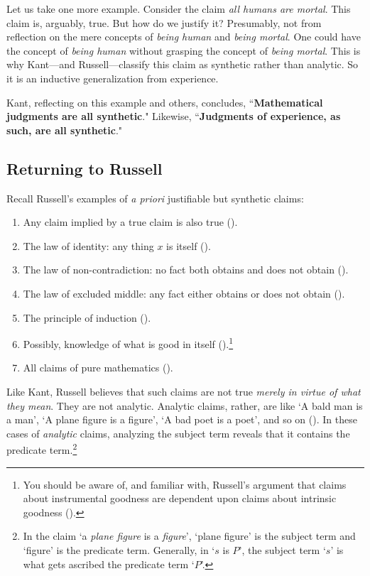 \documentclass[oneside,letterpaper,12pt]{book}
\begin{document}
Let us take one more example. Consider the claim \textit{all humans are mortal}. This claim is, arguably, true. But how do we justify it? Presumably, not from reflection on the mere concepts of \textit{being human} and \textit{being mortal}. One could have the concept of \textit{being human} without grasping the concept of \textit{being mortal}. This is why Kant---and Russell---classify this claim as synthetic rather than analytic. So it is an inductive generalization from experience.

Kant, reflecting on this example and others, concludes, ``\textbf{Mathematical judgments are all synthetic}." Likewise, ``\textbf{Judgments of experience, as such, are all synthetic}." 
\subsection*{Returning to Russell}
Recall Russell's examples of \textit{a priori} justifiable but synthetic claims:
\begin{enumerate}
	\item Any claim implied by a true claim is also true (\pageref{mp}).
	\item The law of identity: any thing $x$ is itself (\pageref{identity}).
	\item The law of non-contradiction: no fact both obtains and does not obtain (\pageref{lnc}).
	\item The law of excluded middle: any fact either obtains or does not obtain (\pageref{lem}).
	\item The principle of induction (\pageref{induction}).
	\item Possibly, knowledge of what is good in itself (\pageref{thegood}).\footnote{You should be aware of, and familiar with, Russell's argument that claims about instrumental goodness are dependent upon claims about intrinsic goodness (\pageref{thegood}).}
	\item All claims of pure mathematics (\pageref{puremath}).
\end{enumerate}
Like Kant, Russell believes that such claims are not true \textit{merely in virtue of what they mean}. They are not analytic. Analytic claims, rather, are like `A bald man is a man', `A plane figure is a figure', `A bad poet is a poet', and so on (\pageref{analytic}). In these cases of \textit{analytic} claims, analyzing the subject term reveals that it contains the predicate term.\footnote{In the claim `a \textit{plane figure} is a \textit{figure}', `plane figure' is the subject term and `figure' is the predicate term. Generally, in `$s$ is $P$', the subject term `$s$' is what gets ascribed the predicate term `$P$'.}
\end{document}
